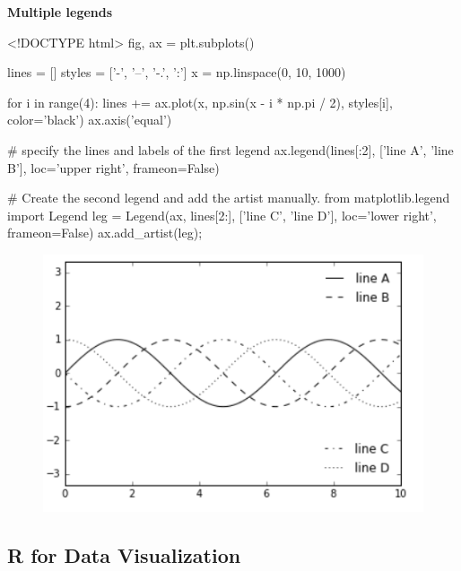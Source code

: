 \documentclass[]{book}
\newenvironment{Shaded}{\begin{snugshade}}{\end{snugshade}}
\newcommand{\DataTypeTok}[1]{\textcolor[rgb]{0.13,0.29,0.53}{#1}}
\newcommand{\NormalTok}[1]{#1}
\theoremstyle{definition}
\theoremstyle{definition}
\theoremstyle{definition}
\theoremstyle{remark}
\begin{document}
\textbf{Multiple legends}

\begin{Shaded}
\begin{Highlighting}[]
\DataTypeTok{<!DOCTYPE }\NormalTok{html}\DataTypeTok{>}
\NormalTok{fig, ax = plt.subplots()}

\NormalTok{lines = []}
\NormalTok{styles = ['-', '--', '-.', ':']}
\NormalTok{x = np.linspace(0, 10, 1000)}

\NormalTok{for i in range(4):}
\NormalTok{    lines += ax.plot(x, np.sin(x - i * np.pi / 2),}
\NormalTok{                     styles[i], color='black')}
\NormalTok{ax.axis('equal')}

\NormalTok{# specify the lines and labels of the first legend}
\NormalTok{ax.legend(lines[:2], ['line A', 'line B'],}
\NormalTok{          loc='upper right', frameon=False)}

\NormalTok{# Create the second legend and add the artist manually.}
\NormalTok{from matplotlib.legend import Legend}
\NormalTok{leg = Legend(ax, lines[2:], ['line C', 'line D'],}
\NormalTok{             loc='lower right', frameon=False)}
\NormalTok{ax.add_artist(leg);}
\end{Highlighting}
\end{Shaded}

\begin{figure}
\centering
\includegraphics{images/legend5.png}
\caption{}
\end{figure}

\subsection{R for Data Visualization}\label{r-for-data-visualization}
\end{document}
